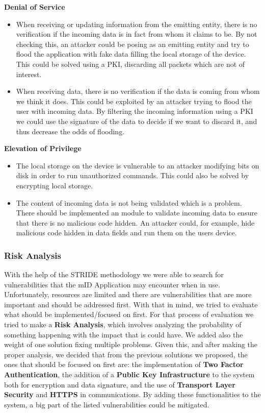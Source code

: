\textbf{Denial of Service}
\begin{itemize}
    \item When receiving or updating information from the emitting entity, there is no verification if the incoming data is in fact from whom it claims to be. By not checking this, an attacker could be posing as an emitting entity and try to flood the application with fake data filling the local storage of the device. This could be solved using a PKI\cite{pki}, discarding all packets which are not of interest.
    \item When receiving data, there is no verification if the data is coming from whom we think it does. This could be exploited by an attacker trying to flood the user with incoming data. By filtering the incoming information using a PKI\cite{pki} we could use the signature of the data to decide if we want to discard it, and thus decrease the odds of flooding.
\end{itemize}

\textbf{Elevation of Privilege}
\begin{itemize}
    \item The local storage on the device is vulnerable to an attacker modifying bits on disk in order to run unauthorized commands. This could also be solved by encrypting local storage.
    \item The content of incoming data is not being validated which is a problem. There should be implemented an module to validate incoming data to ensure that there is no malicious code hidden. An attacker could, for example, hide malicious code hidden in data fields and run them on the users device.
\end{itemize}

\subsubsection{Risk Analysis}

With the help of the STRIDE methodology we were able to search for vulnerabilities that the mID Application may encounter when in use. Unfortunately, resources are limited and there are vulnerabilities that are more important and should be addressed first. With that in mind, we tried to evaluate what should be implemented/focused on first. For that process of evaluation we tried to make a \textbf{Risk Analysis}, which involves analyzing the probability of something happening with the impact that is could have. We added also the weight of one solution fixing multiple problems.
Given this, and after making the proper analysis, we decided that from the previous solutions we proposed, the ones that should be focused on first are: the implementation of \textbf{Two Factor Authentication}, the addition of a \textbf{Public Key Infrastructure} to the system both for encryption and data signature, and the use of \textbf{Transport Layer Security} and \textbf{HTTPS} in communications. By adding these functionalities to the system, a big part of the listed vulnerabilities could be mitigated.